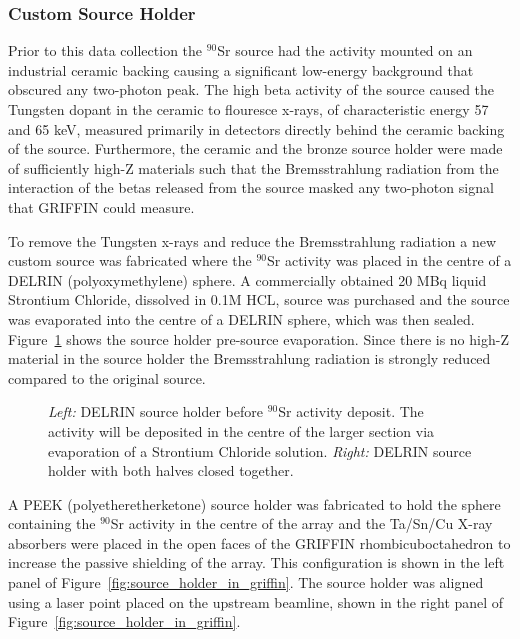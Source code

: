\documentclass[cnatzke_thesis_proposal.tex]{subfiles}
\begin{document}
\subsubsection{Custom Source Holder}

Prior to this data collection the $^{90}$Sr source had the activity mounted on an industrial ceramic backing causing a significant low-energy background that obscured any two-photon peak. 
The high beta activity of the source caused the Tungsten dopant in the ceramic to flouresce x-rays, of characteristic energy 57 and 65 keV, measured primarily in detectors directly behind the ceramic backing of the source. 
Furthermore, the ceramic and the bronze source holder were made of sufficiently high-Z materials such that the Bremsstrahlung radiation from the interaction of the betas released from the source masked any two-photon signal that GRIFFIN could measure. 

To remove the Tungsten x-rays and reduce the Bremsstrahlung radiation a new custom source was fabricated where the $^{90}$Sr activity was placed in the centre of a DELRIN (polyoxymethylene) sphere. 
A commercially obtained 20 MBq liquid Strontium Chloride, dissolved in 0.1M HCL, source was purchased and the source was evaporated into the centre of a DELRIN sphere, which was then sealed. 
Figure~\ref{fig:source_holder} shows the source holder pre-source evaporation. 
Since there is no high-Z material in the source holder the Bremsstrahlung radiation is strongly reduced compared to the original source. 


\begin{figure}[htbp]
  \centering
  \qquad
  \caption{
    \textit{Left:} DELRIN source holder before $^{90}$Sr activity deposit. The activity will be deposited in the centre of the larger section via evaporation of a Strontium Chloride solution. 
    \textit{Right:} DELRIN source holder with both halves closed together.
  }
  \label{fig:source_holder}
\end{figure}

A PEEK (polyetheretherketone) source holder was fabricated to hold the sphere containing the $^{90}$Sr activity in the centre of the array and the Ta/Sn/Cu X-ray absorbers were placed in the open faces of the GRIFFIN rhombicuboctahedron to increase the passive shielding of the array. This configuration is shown in the left panel of Figure~\ref{fig:source_holder_in_griffin}. The source holder was aligned using a laser point placed on the upstream beamline, shown in the right panel of Figure~\ref{fig:source_holder_in_griffin}.
\end{document}
